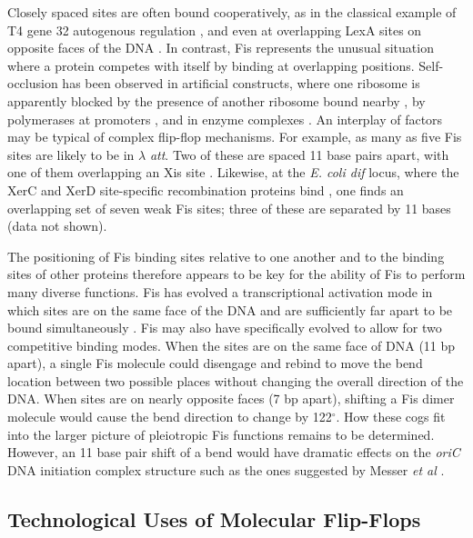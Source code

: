 \documentclass[doublespacing]{narfront}
\newcommand{\degrees}{${}^{\circ}$}
\begin{document}
Closely spaced sites are often bound cooperatively,
as in the classical example of T4 gene 32
autogenous regulation
\cite{Miller1994},
and even at overlapping LexA sites
on opposite faces of the DNA
\cite{Ebina1983,Lloubes.Schnarr1991}.
In contrast,
Fis represents the unusual situation
where a protein competes with itself
by binding at overlapping positions.
Self-occlusion has been observed
in artificial constructs,
where one ribosome is apparently blocked by the
presence of another ribosome bound nearby
\cite{Barrick.ribosomes1994},
by polymerases
at promoters
\cite{Goodrich.McClure1991,Goodrich.McClure1992,Strainic.deHaseth2000,Xu.Koudelka2000},
and in enzyme complexes \cite{Mande.Hol1996}.
An interplay of factors may be typical of
complex flip-flop mechanisms.
For example,
as many as five Fis sites are likely to be                    
in $\lambda$ \emph{att}.
Two of these are spaced 11 base pairs apart,
with one of them overlapping an Xis site
\cite{Schneider.walker}.
Likewise, at
the \emph{E. coli dif} locus,
where the
XerC and XerD
site-specific recombination proteins bind \cite{Blakely.Sherratt1994},
one finds
an overlapping
set of seven weak Fis sites;
three of these are
separated by 11 bases
(data not shown).

The positioning of Fis binding sites relative to one another
and to the binding sites of other proteins
therefore appears to be key for the ability of
Fis to perform many diverse functions.
Fis has evolved a transcriptional activation mode in which
sites are on the same face of the DNA and are sufficiently
far apart to be bound simultaneously \cite{Muskhelishvili1995}.
Fis may also have specifically evolved
to allow for two competitive binding modes.
When the sites are on the same face of DNA (11 bp apart), 
a single Fis molecule could
disengage and rebind 
to move the bend location between two possible places
without changing the overall direction of the DNA.  
When sites are on nearly opposite faces (7 bp apart),
shifting a Fis
dimer
molecule would cause
the bend direction to change by 122\degrees.
How these cogs fit into the larger
picture of pleiotropic Fis functions remains to be determined.
However,
an 11 base pair shift of a bend
would have dramatic effects on 
the \emph{oriC}
DNA initiation
complex structure such as the ones suggested
by Messer \emph{et al}
\cite{Messer1992,Woelker.Messer1993}.

\subsection*{Technological Uses of Molecular Flip-Flops}
\end{document}
